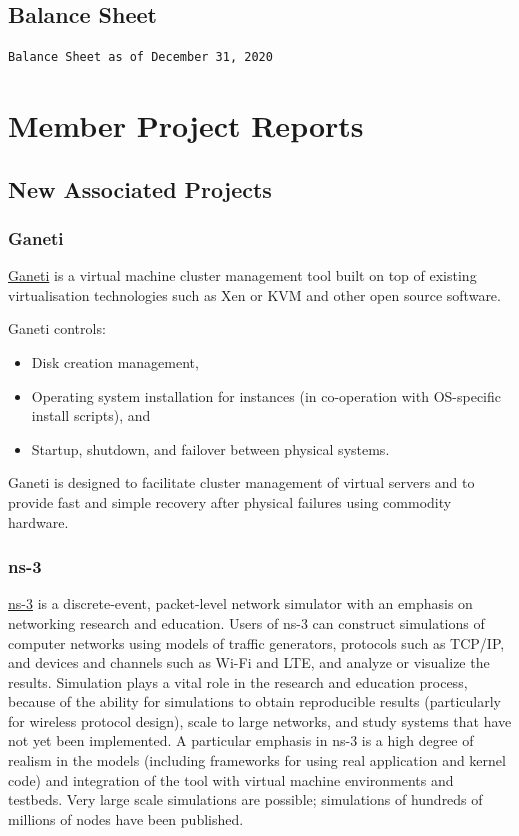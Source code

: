\documentclass[a4paper]{report}
\begin{document}
\section{Balance Sheet}

\begin{verbatim}
Balance Sheet as of December 31, 2020
\end{verbatim}

\chapter{Member Project Reports}

\section{New Associated Projects}

\subsection{Ganeti}

\href{https://www.ganeti.org/}{Ganeti} is a virtual machine cluster management tool built on top of existing virtualisation technologies such as Xen or KVM and other open source software.

Ganeti controls:

\begin{itemize}

\item Disk creation management,
\item Operating system installation for instances (in co-operation with OS-specific install scripts), and
\item Startup, shutdown, and failover between physical systems.

\end{itemize}

Ganeti is designed to facilitate cluster management of virtual servers and to provide fast and simple recovery after physical failures using commodity hardware.

\subsection{ns-3}

\href{https://www.nsnam.org/}{ns-3} is a discrete-event, packet-level network simulator with an emphasis on networking research and education. Users of ns-3 can construct simulations of computer networks using models of traffic generators, protocols such as TCP/IP, and devices and channels such as Wi-Fi and LTE, and analyze or visualize the results. Simulation plays a vital role in the research and education process, because of the ability for simulations to obtain reproducible results (particularly for wireless protocol design), scale to large networks, and study systems that have not yet been implemented. A particular emphasis in ns-3 is a high degree of realism in the models (including frameworks for using real application and kernel code) and integration of the tool with virtual machine environments and testbeds. Very large scale simulations are possible; simulations of hundreds of millions of nodes have been published.
\end{document}
